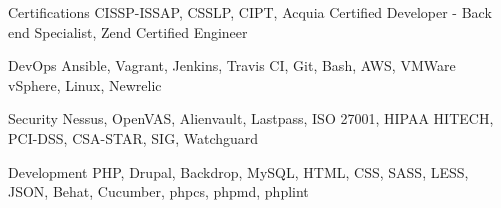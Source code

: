 


\begin{cvskills}


\cvskill
{Certifications}
{CISSP-ISSAP, CSSLP, CIPT, Acquia Certified Developer - Back end Specialist, Zend Certified Engineer }

\cvskill
{DevOps}
{Ansible, Vagrant, Jenkins, Travis CI, Git, Bash, AWS, VMWare vSphere, Linux, Newrelic }

\cvskill
{Security}
{Nessus, OpenVAS, Alienvault, Lastpass, ISO 27001, HIPAA HITECH, PCI-DSS, CSA-STAR, SIG, Watchguard }

\cvskill
{Development}
{PHP, Drupal, Backdrop, MySQL, HTML, CSS, SASS, LESS, JSON, Behat, Cucumber, phpcs, phpmd, phplint }




\end{cvskills}
